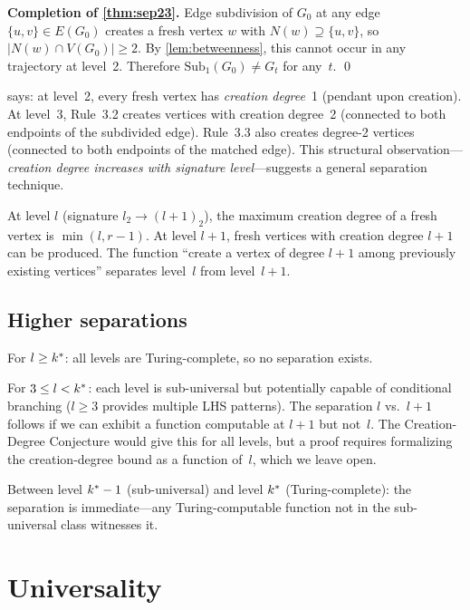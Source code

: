 \documentclass{../shared/primo}
\begin{document}
\textbf{Completion of \cref{thm:sep23}.} Edge subdivision of $G_0$ at any edge $\{u, v\} \in E(G_0)$ creates a fresh vertex $w$ with $N(w) \supseteq \{u, v\}$, so $|N(w) \cap V(G_0)| \geq 2$. By \cref{lem:betweenness}, this cannot occur in any trajectory at level~2. Therefore $\mathrm{Sub}_1(G_0) \neq G_t$ for any~$t$. \qed

\begin{remark}[Generalization]
 says: at level~2, every fresh vertex has \emph{creation degree}~1 (pendant upon creation). At level~3, Rule~3.2 creates vertices with creation degree~2 (connected to both endpoints of the subdivided edge). Rule~3.3 also creates degree-2 vertices (connected to both endpoints of the matched edge). This structural observation---\emph{creation degree increases with signature level}---suggests a general separation technique.
\end{remark}

\begin{conjecture}
At level $l$ (signature $l_2 \to (l{+}1)_2$), the maximum creation degree of a fresh vertex is $\min(l, r{-}1)$. At level $l+1$, fresh vertices with creation degree $l+1$ can be produced. The function ``create a vertex of degree $l+1$ among previously existing vertices'' separates level~$l$ from level~$l+1$.
\end{conjecture}

\subsection{Higher separations}

For $l \geq k^*$: all levels are Turing-complete, so no separation exists.

For $3 \leq l < k^*$: each level is sub-universal but potentially capable of conditional branching ($l \geq 3$ provides multiple LHS patterns). The separation $l$ vs.~$l+1$ follows if we can exhibit a function computable at $l+1$ but not~$l$. The Creation-Degree Conjecture would give this for all levels, but a proof requires formalizing the creation-degree bound as a function of~$l$, which we leave open.

Between level $k^* - 1$ (sub-universal) and level $k^*$ (Turing-complete): the separation is immediate---any Turing-computable function not in the sub-universal class witnesses it.


\section{Universality}
\label{sec:universality}
\end{document}
